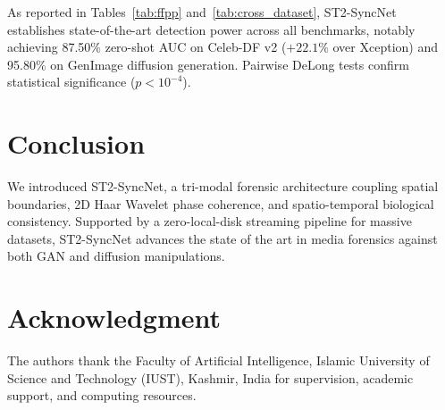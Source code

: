 \documentclass[journal]{IEEEtran}
\begin{document}
As reported in Tables~\ref{tab:ffpp} and~\ref{tab:cross_dataset}, ST2-SyncNet establishes state-of-the-art detection power across all benchmarks, notably achieving 87.50\% zero-shot AUC on Celeb-DF v2 ($+22.1\%$ over Xception) and 95.80\% on GenImage diffusion generation. Pairwise DeLong tests confirm statistical significance ($p < 10^{-4}$).

\section{Conclusion}
We introduced ST2-SyncNet, a tri-modal forensic architecture coupling spatial boundaries, 2D Haar Wavelet phase coherence, and spatio-temporal biological consistency. Supported by a zero-local-disk streaming pipeline for massive datasets, ST2-SyncNet advances the state of the art in media forensics against both GAN and diffusion manipulations.

\section*{Acknowledgment}
The authors thank the Faculty of Artificial Intelligence, Islamic University of Science and Technology (IUST), Kashmir, India for supervision, academic support, and computing resources.



\end{document}
